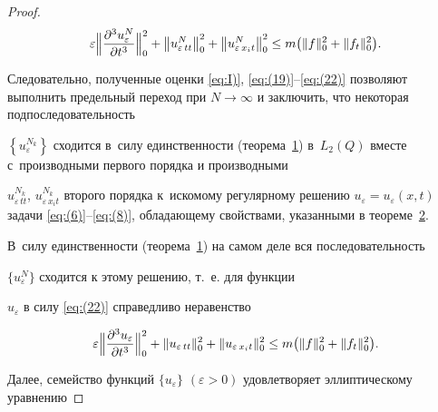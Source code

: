\begin{proof}
\begin{equation}
\varepsilon \Bigl\| \frac{{{\partial }^{3}}u_{\varepsilon }^{N}}{\partial t ^{3}} \Bigr\|_{0}^{2}+

\left\| u_{\varepsilon \,t t}^{N} \right\|_{0}^{2}+

\left\| u_{\varepsilon \, {{x}_{i}}t}^{N} \right\|_{0}^{2}

\le 

m\bigl( \| f \|_{0}^{2}+ \| {{f}_{t}} \|_{0}^{2} \bigr) .

\label{eq:(22)}

\end{equation} 

Следовательно, полученные оценки \eqref{eq:I)}, \eqref{eq:(19)}--\eqref{eq:(22)}  позволяют выполнить предельный переход при $N\to \infty $ и заключить, что некоторая  подпоследовательность 

$\left\{ u_{\varepsilon }^{{{N}_{k}}} \right\}$ сходится в~силу единственности (теорема~\hyperlink{dzh:th1}{1}) в~${{L}_{2}}(Q)$ вместе с~производными первого порядка и производными 

$u_{\varepsilon \, t t}^{{{N}_{k}}}$, $u_{\varepsilon \, {{x}_{i}}t}^{{{N}_{k}}}$ второго порядка  к~искомому регулярному решению ${{u}_{\varepsilon }} ={{u}_{\varepsilon }}(x,t)$ задачи \eqref{eq:(6)}--\eqref{eq:(8)}, обладающему свойствами, указанными в теореме~\hyperlink{dzh:th2}{2}.  

В~силу единственности (теорема~\hyperlink{dzh:th1}{1}) на самом деле вся последовательность 

$\{ u_{\varepsilon }^{N} \}$ сходится к этому решению, т.~е. для функции 

${{u}_{\varepsilon }} $  в силу \eqref{eq:(22)} справедливо неравенство

\begin{equation}

\varepsilon 

\Bigl\| 

\frac{\partial ^3 u_\varepsilon }{\partial t ^3} \Bigr\|_{0}^{2}+

\| u_{\varepsilon \, tt}  \|_{0}^{2}+

\| u_{\varepsilon \, {{x}_{i}}t} \|_{0}^{2}\le m

\bigl( \| f \|_{0}^{2}+\| {{f}_{t}} \|_{0}^{2} \bigr). 

\label{eq:(23)}

\end{equation} 

Далее,  семейство функций $ \{ u_ \varepsilon \}$ $(\varepsilon >0)$ удовлетворяет эллиптическому  уравнению  


\end{proof}
